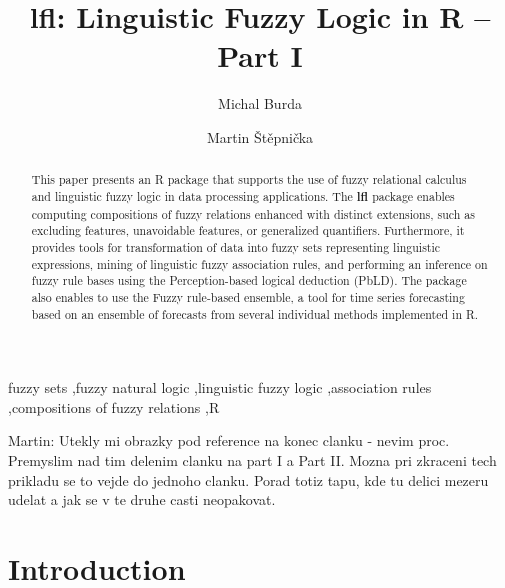 \documentclass[review]{elsarticle}
\newcommand{\pkg}[1]{\textbf{#1}}
\newcommand{\proglang}[1]{#1}
\newcommand{\R}{\proglang{R}}
\newcommand{\Martin}[1]{{\color{blue} Martin: #1}}
\begin{document}
\begin{frontmatter}

\title{lfl: Linguistic Fuzzy Logic in \R{} -- Part I}

\author{Michal Burda}
\author{Martin \v{S}t\v{e}pni\v{c}ka}
\address{Institute for Research and Applications of Fuzzy Modeling, University of Ostrava, CE~IT4Innovations, 30.~dubna 22, 701 03 Ostrava, Czech Republic}


\begin{abstract}
This paper presents an \R{} package that supports the use of fuzzy relational calculus and linguistic fuzzy logic in data processing applications. The \pkg{lfl} package enables computing compositions of fuzzy relations enhanced with distinct extensions, such as excluding features, unavoidable features, or generalized quantifiers. Furthermore, it provides tools for transformation of data into fuzzy sets representing linguistic expressions, mining of linguistic fuzzy association rules, and performing an inference on fuzzy rule bases using the Perception-based logical deduction (PbLD). The package also enables to use the Fuzzy rule-based ensemble, a tool for time series forecasting based on an ensemble of forecasts from several individual methods implemented in \R{}.
\end{abstract}

\begin{keyword}
fuzzy sets \sep fuzzy natural logic \sep linguistic fuzzy logic \sep association rules \sep compositions of fuzzy relations \sep\R{}
\end{keyword}

\end{frontmatter}

\linenumbers

\Martin{Utekly mi obrazky pod reference na konec clanku - nevim proc. \\ Premyslim nad tim delenim clanku na part I a Part II. Mozna pri zkraceni tech prikladu se to vejde do jednoho clanku. Porad totiz tapu, kde tu delici mezeru udelat a jak se v te druhe casti neopakovat. }

\section{Introduction} \label{sec:intro}
\end{document}
